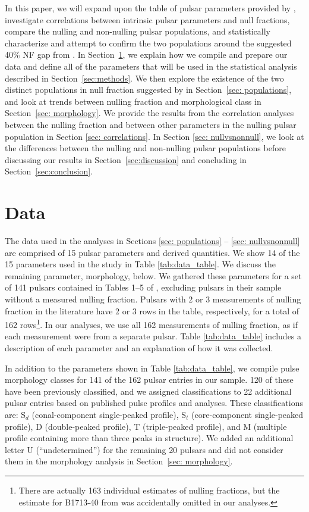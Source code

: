 \documentclass[fleqn,usenatbib]{mnras}
\begin{document}
In this paper, we will expand upon the table of pulsar parameters provided by \citet{Konar2019}, investigate correlations between intrinsic pulsar parameters and null fractions, compare the nulling and non-nulling pulsar populations, and statistically characterize and attempt to confirm the two populations around the suggested 40\% NF gap from \citet{Konar2019}. In Section~\ref{sec:data}, we explain how we compile and prepare our data and define all of the parameters that will be used in the statistical analysis described in Section~\ref{sec:methods}. We then explore the existence of the two distinct populations in null fraction suggested by \citet{Konar2019} in Section~\ref{sec: populations}, and look at trends between nulling fraction and morphological class in Section~\ref{sec: morphology}.  We provide the results from the correlation analyses between the nulling fraction and between other parameters in the nulling pulsar population in Section \ref{sec: correlations}. In Section \ref{sec: nullvsnonnull}, we look at the differences between the nulling and non-nulling pulsar populations before discussing our results in Section~\ref{sec:discussion} and concluding in Section~\ref{sec:conclusion}.
\newpage

\section{Data} 
\label{sec:data}

The data used in the analyses in Sections \ref{sec: populations} -- \ref{sec: nullvsnonnull} are comprised of 15 pulsar parameters and derived quantities. We show 14 of the 15 parameters used in the study in Table \ref{tab:data_table}. We discuss the remaining parameter, morphology, below. We gathered these parameters for a set of 141 pulsars contained in Tables 1--5 of \citet{Konar2019}, excluding pulsars in their sample without a measured nulling fraction. Pulsars with 2 or 3 measurements of nulling fraction in the literature have 2 or 3 rows in the table, respectively, for a total of 162 rows\footnote{There are actually 163 individual estimates of nulling fractions, but the estimate for B1713-40 from \citet{Wang2007} was accidentally omitted in our analyses.}. In our analyses, we use all 162 measurements of nulling fraction, as if each measurement were from a separate pulsar. Table \ref{tab:data_table} includes a description of each parameter and an explanation of how it was collected.

In addition to the parameters shown in Table \ref{tab:data_table}, we compile \citet{Rankin1983} pulse morphology classes for 141 of the 162 pulsar entries in our sample. 120 of these have been previously classified, and we assigned classifications to 22 additional pulsar entries based on published pulse profiles and analyses. These classifications are: S$_d$ (conal-component single-peaked profile), S$_t$ (core-component single-peaked profile), D (double-peaked profile), T (triple-peaked profile), and M (multiple profile containing more than three peaks in structure). We added an additional letter U (``undetermined'') for the remaining 20 pulsars and did not consider them in the morphology analysis in Section~\ref{sec: morphology}.
\end{document}
